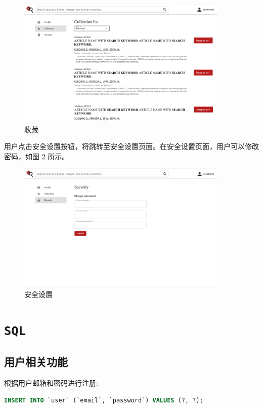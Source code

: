 \documentclass[UTF8,openany]{ctexbook}
\begin{document}
\begin{figure}[H]
\centering
\includegraphics[width=0.9\textwidth]{img/9.png}
\caption{收藏}
\label{fig:collect}
\end{figure}

用户点击安全设置按钮，将跳转至安全设置页面。在安全设置页面，用户可以修改密码，如图 \ref{fig:security} 所示。

\begin{figure}[H]
\centering
\includegraphics[width=0.9\textwidth]{img/10.png}
\caption{安全设置}
\label{fig:security}
\end{figure}

\chapter{\texttt{SQL}}

\section{用户相关功能}

根据用户邮箱和密码进行注册:

\begin{lstlisting}[language=SQL]
INSERT INTO `user` (`email`, `password`) VALUES (?, ?);
\end{lstlisting}
\end{document}
